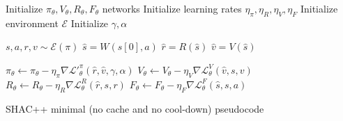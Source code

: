 \begin{algorithm}[t]
    \begin{algorithmic}[1]
    \STATE Initialize $\pi_\theta,V_\theta,R_\theta,F_\theta$ networks
    \STATE Initialize learning rates $\eta_\pi, \eta_R, \eta_V, \eta_F$
    \STATE Initialize environment $\mathcal{E}$
    \STATE Initialize $\gamma, \alpha$
    
        
        \STATE $s,a,r,v \sim \mathcal{E}(\pi)$
        \STATE $\hat{s} = W(s[0], a)$
        \STATE $\hat{r} = R(\hat{s})$
        \STATE $\hat{v} = V(\hat{s})$
        
        \STATE $\pi_\theta \gets \pi_\theta - \eta_\pi \nabla \mathcal{L'}^\pi_\theta(\hat{r},\hat{v},\gamma,\alpha)$
        \STATE $V_\theta \gets V_\theta - \eta_V \nabla \mathcal{L}^V_\theta(\hat{v},s,v)$
        \STATE $R_\theta \gets R_\theta - \eta_R \nabla \mathcal{L}^R_\theta(\hat{r},s,r)$
        \STATE $F_\theta \gets F_\theta - \eta_F \nabla \mathcal{L}^F_\theta(\hat{s},s,a)$
    
    \ENDFOR
    
    \end{algorithmic}
    \caption{SHAC++ minimal (no cache and no cool-down) pseudocode}
    \label{alg:shacpp}
\end{algorithm}


